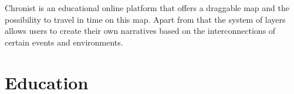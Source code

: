 \documentclass[11pt, a4paper, sans]{moderncv}
\begin{document}
Chronist is an educational online platform that offers a draggable map and the possibility to travel in time on this map. Apart from that the system of layers allows users to create their own narratives based on the interconnections of certain events and environments.


\section{Education}

\end{document}
